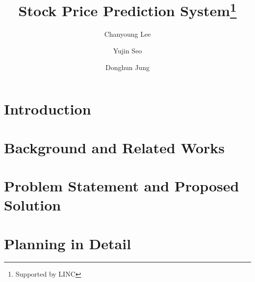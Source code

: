 \documentclass[runningheads]{llncs}
\begin{document}
%
\title{Stock Price Prediction System\thanks{Supported by LINC}}
%
%
\author{Chanyoung Lee \and
Yujin Seo \and
Donghun Jung}
%
%
%
\maketitle              %
%
\begin{abstract}

\end{abstract}
%
%
%
\section{Introduction}
\label{sec:Introduction}


\section{Background and Related Works}
\label{sec:BackgroundAndRelatedWorks}


\section{Problem Statement and Proposed Solution}
\label{sec:ProblemStatementAndProposedSolution}


\section{Planning in Detail}
\label{sec:PlanningInDetail}




\end{document}

